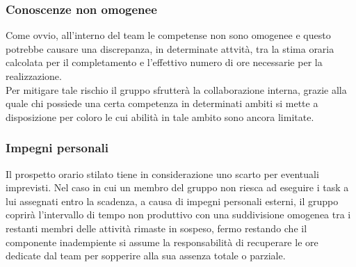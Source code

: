\subsubsection{Conoscenze non omogenee}
Come ovvio, all'interno del team le competense non sono omogenee e questo potrebbe causare una discrepanza, in determinate attvità, tra la stima oraria calcolata per il completamento e l'effettivo numero di ore necessarie per la realizzazione.
\\
Per mitigare tale rischio il gruppo sfrutterà la collaborazione interna, grazie alla quale chi possiede una certa competenza in determinati ambiti si mette a disposizione per coloro le cui abilità in tale ambito sono ancora limitate. 

\subsubsection{Impegni personali}
Il prospetto orario stilato tiene in considerazione uno scarto per eventuali imprevisti.
Nel caso in cui un membro del gruppo non riesca ad eseguire i task a lui assegnati entro la scadenza, a causa di impegni personali esterni, il gruppo coprirà l'intervallo di tempo non produttivo con una suddivisione omogenea tra i restanti membri delle attività rimaste in sospeso, fermo restando che il componente inadempiente si assume la responsabilità di recuperare le ore dedicate dal team per sopperire alla sua assenza totale o parziale.



